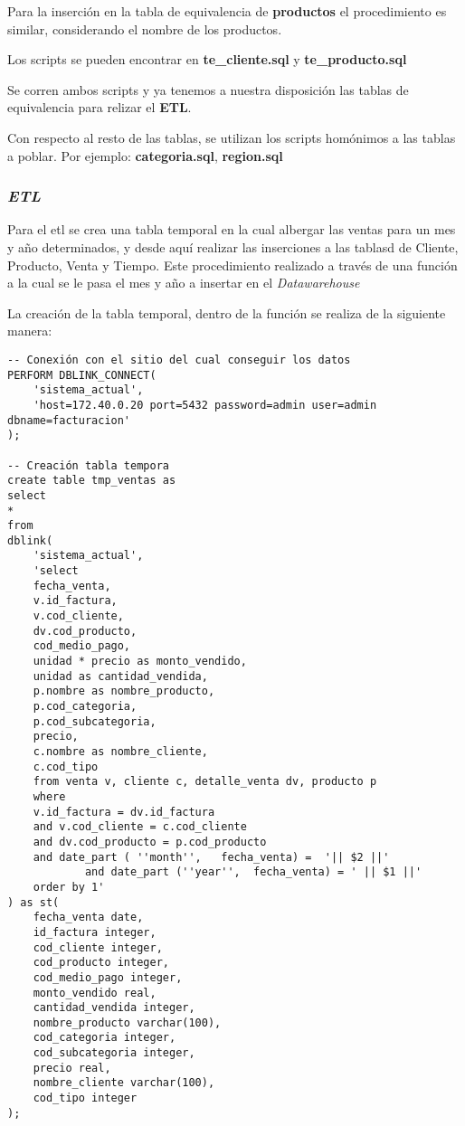 Para la inserción en la tabla de equivalencia de \textbf{productos} el procedimiento es similar, considerando el nombre de los productos.

Los scripts se pueden encontrar en \textbf{te\_cliente.sql} y \textbf{te\_producto.sql}

Se corren ambos scripts y ya tenemos a nuestra disposición las tablas de equivalencia para relizar el \textbf{ETL}.

Con respecto al resto de las tablas, se utilizan los scripts homónimos a las tablas a poblar. Por ejemplo: \textbf{categoria.sql}, \textbf{region.sql}


\subsubsection{\emph{ETL}}

Para el etl se crea una tabla temporal en la cual albergar las ventas para un mes y año determinados, y desde aquí realizar las inserciones a las tablasd de Cliente, Producto, Venta y Tiempo. Este procedimiento realizado a través de una función a la cual se le pasa el mes y año a insertar en el \emph{Datawarehouse}

La creación de la tabla temporal, dentro de la función se realiza de la siguiente manera:

\begin{lstlisting}[title=Creación de la Tabla Temporal]
-- Conexión con el sitio del cual conseguir los datos
PERFORM DBLINK_CONNECT(
    'sistema_actual',
    'host=172.40.0.20 port=5432 password=admin user=admin dbname=facturacion'
);

-- Creación tabla tempora
create table tmp_ventas as
select
* 
from 
dblink(
    'sistema_actual', 
    'select
    fecha_venta,
    v.id_factura,
    v.cod_cliente,
    dv.cod_producto,
    cod_medio_pago,
    unidad * precio as monto_vendido,
    unidad as cantidad_vendida,
    p.nombre as nombre_producto,
    p.cod_categoria,
    p.cod_subcategoria,
    precio,
    c.nombre as nombre_cliente,
    c.cod_tipo
    from venta v, cliente c, detalle_venta dv, producto p
    where 
    v.id_factura = dv.id_factura
    and v.cod_cliente = c.cod_cliente
    and dv.cod_producto = p.cod_producto 
    and date_part ( ''month'',   fecha_venta) =  '|| $2 ||'
            and date_part (''year'',  fecha_venta) = ' || $1 ||'
    order by 1'
) as st(
    fecha_venta date,
    id_factura integer,
    cod_cliente integer,
    cod_producto integer,
    cod_medio_pago integer,
    monto_vendido real,
    cantidad_vendida integer,
    nombre_producto varchar(100),
    cod_categoria integer,
    cod_subcategoria integer,
    precio real,
    nombre_cliente varchar(100),
    cod_tipo integer
);
\end{lstlisting}

